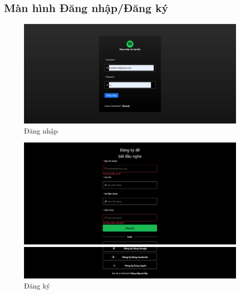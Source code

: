 \documentclass[a4paper]{article}
\begin{document}
   \subsection{Màn hình Đăng nhập/Đăng ký}
   \begin{figure}[H]
       \centering
       \includegraphics[width=1\linewidth]{img/login.jpg}
       \caption{Đăng nhập}
       \label{fig:enter-label}
   \end{figure}
   \begin{figure}[H]
  \centering
  \begin{minipage}[b]{1\textwidth}
    \centering
    \includegraphics[width=\textwidth]{img/register1.jpg}
  \end{minipage}
  \hfill
  \begin{minipage}[b]{1\textwidth}
    \centering
    \includegraphics[width=\textwidth]{img/register2.jpg}
  \end{minipage}
  \caption{Đăng ký}
\end{figure}
\end{document}
